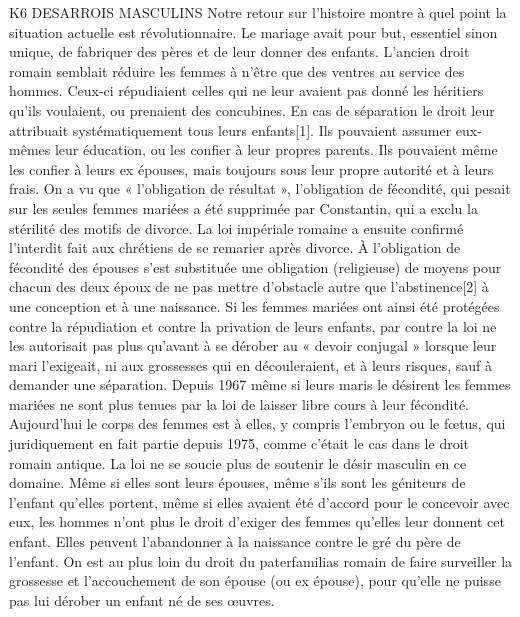 K6 DESARROIS MASCULINS 
 Notre retour sur l'histoire montre à quel point la situation actuelle est révolutionnaire. Le mariage avait pour but, essentiel sinon unique, de fabriquer des pères et de leur donner des enfants. L'ancien droit romain semblait réduire les femmes à n'être que des ventres au service des hommes. Ceux-ci répudiaient celles qui ne leur avaient pas donné les héritiers qu'ils voulaient, ou prenaient des concubines. En cas de séparation le droit leur attribuait systématiquement tous leurs enfants[1]. Ils pouvaient assumer eux-mêmes leur éducation, ou les confier à leur propres parents. Ils pouvaient même les confier à leurs ex épouses, mais toujours sous leur propre autorité et à leurs frais.
 On a vu que « l'obligation de résultat », l'obligation de fécondité, qui pesait sur les seules femmes mariées a été supprimée par Constantin, qui a exclu la stérilité des motifs de divorce. La loi impériale romaine a ensuite confirmé l'interdit fait aux chrétiens de se remarier après divorce. À l'obligation de fécondité des épouses s'est substituée une obligation (religieuse) de moyens pour chacun des deux époux de ne pas mettre d'obstacle autre que l'abstinence[2] à une conception et à une naissance. Si les femmes mariées ont ainsi été protégées contre la répudiation et contre la privation de leurs enfants, par contre la loi ne les autorisait pas plus qu'avant à se dérober au « devoir conjugal » lorsque leur mari l'exigeait, ni aux grossesses qui en découleraient, et à leurs risques, sauf à demander une séparation. 
 Depuis 1967 même si leurs maris le désirent les femmes mariées ne sont plus tenues par la loi de laisser libre cours à leur fécondité. Aujourd'hui le corps des femmes est à elles, y compris l'embryon ou le fœtus, qui juridiquement en fait partie depuis 1975, comme c'était le cas dans le droit romain antique. 
 La loi ne se soucie plus de soutenir le désir masculin en ce domaine. Même si elles sont leurs épouses, même s'ils sont les géniteurs de l'enfant qu'elles portent, même si elles avaient été d'accord pour le concevoir avec eux, les hommes n'ont plus le droit d'exiger des femmes qu'elles leur donnent cet enfant. Elles peuvent l'abandonner à la naissance contre le gré du père de l'enfant. On est au plus loin du droit du paterfamilias romain de faire surveiller la grossesse et l'accouchement de son épouse (ou ex épouse), pour qu'elle ne puisse pas lui dérober un enfant né de ses œuvres.
